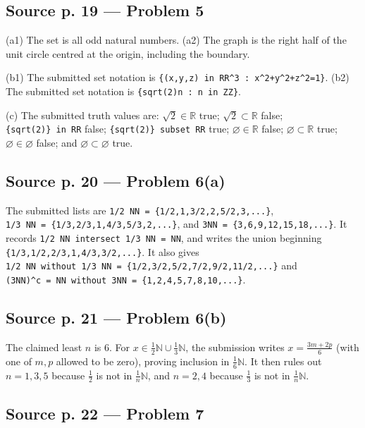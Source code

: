 \subsection{Source p. 19 --- Problem 5}

(a1) The set is all odd natural numbers. (a2) The graph is the right half of the unit circle centred at the origin, including the boundary.

(b1) The submitted set notation is \texttt{\{(x,y,z)\ in\ RR\^{}3\ :\ x\^{}2+y\^{}2+z\^{}2=1\}}. (b2) The submitted set notation is \texttt{\{sqrt(2)n\ :\ n\ in\ ZZ\}}.

(c) The submitted truth values are: \(\sqrt{2} \in \mathbb{R}\) true; \(\sqrt{2} \subset \mathbb{R}\) false; \texttt{\{sqrt(2)\}\ in\ RR} false; \texttt{\{sqrt(2)\}\ subset\ RR} true; \(\varnothing \in \mathbb{R}\) false; \(\varnothing \subset \mathbb{R}\) true; \(\varnothing \in \varnothing\) false; and \(\varnothing \subset \varnothing\) true.

\subsection{Source p. 20 --- Problem 6(a)}

The submitted lists are \texttt{1/2\ NN\ =\ \{1/2,1,3/2,2,5/2,3,...\}}, \texttt{1/3\ NN\ =\ \{1/3,2/3,1,4/3,5/3,2,...\}}, and \texttt{3NN\ =\ \{3,6,9,12,15,18,...\}}. It records \texttt{1/2\ NN\ intersect\ 1/3\ NN\ =\ NN}, and writes the union beginning \texttt{\{1/3,1/2,2/3,1,4/3,3/2,...\}}. It also gives \texttt{1/2\ NN\ without\ 1/3\ NN\ =\ \{1/2,3/2,5/2,7/2,9/2,11/2,...\}} and \texttt{(3NN)\^{}c\ =\ NN\ without\ 3NN\ =\ \{1,2,4,5,7,8,10,...\}}.

\subsection{Source p. 21 --- Problem 6(b)}

The claimed least \(n\) is \(6\). For \(x \in \frac{1}{2}\mathbb{N} \cup \frac{1}{3}\mathbb{N}\), the submission writes \(x = \frac{3m + 2p}{6}\) (with one of \(m,p\) allowed to be zero), proving inclusion in \(\frac{1}{6}\mathbb{N}\). It then rules out \(n = 1,3,5\) because \(\frac{1}{2}\) is not in \(\frac{1}{n}\mathbb{N}\), and \(n = 2,4\) because \(\frac{1}{3}\) is not in \(\frac{1}{n}\mathbb{N}\).

\subsection{Source p. 22 --- Problem 7}

